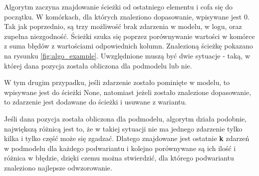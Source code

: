 Algorytm zaczyna znajdowanie ścieżki od ostatniego elementu i cofa się do początku. W komórkach, dla których znaleziono dopasowanie, wpisywane jest 0. Tak jak poprzednio, są trzy możliwość brak zdarzenia w modelu, w logu, oraz zupełna niezgodność. Ścieżki szuka się poprzez porównywanie wartości w komórce z suma błędów z wartościami odpowiednich kolumn. Znalezioną ścieżkę pokazano na rysunku \ref{fig:algo_example}. Uwzględnione muszą być dwie sytuacje - taką, w której dana pozycja została obliczona dla podmodelu lub nie.

W tym drugim przypadku, jeśli zdarzenie zostało pominięte w modelu, to wpisywane jest do ścieżki None, natomiast jeżeli zostało znalezione dopasowanie, to zdarzenie jest dodawane do ścieżki i usuwane z wariantu.

Jeśli dana pozycja została obliczona dla podmodelu, algorytm działa podobnie, największą różnicą jest to, że w takiej sytuacji nie ma jednego zdarzenie tylko kilka i tylko część może się zgadzać. Dlatego znajdowane jest ostatnie \textbf{k} zdarzeń w podmodelu dla każdego podwariantu i kolejno porównywane są ich ilość i różnica w błędzie, dzięki czemu można stwierdzić, dla którego podwariantu znaleziono najlepsze odwzorowanie. 

